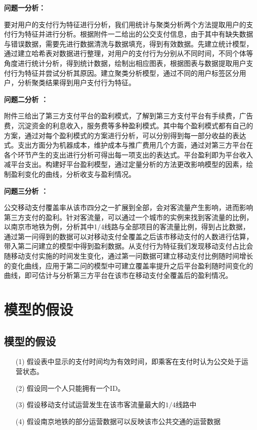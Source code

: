 \documentclass[withoutpreface,bwprint]{cumcmthesis} %
\begin{document}
\textbf{问题一分析：}

要对用户的支付行为特征进行分析，我们用统计与聚类分析两个方法提取用户的支付行为特征并进行分析。根据附件一二给出的公交支付信息，由于其中有缺失数据与错误数据，需要先进行数据清洗与数据填充，得到有效数据。先建立统计模型，通过建立哈希表对数据进行整理，对用户的支付行为分别从不同时间，不同个体等角度进行统计分析，得到统计数据，绘制出相应图表，根据图表与数据提取用户支付行为特征并尝试分析其原因。建立聚类分析模型，通过不同的用户标签区分用户，分析聚类结果得到用户支付行为特征。

\textbf{问题二分析 ：}

附件三给出了第三方支付平台的盈利模式，了解到第三方支付平台有手续费，广告费，沉淀资金的利息收入，服务费等多种盈利模式。其中每个盈利模式都有自己的方案，通过对每个盈利模式的方案进行分析，可以分别得到每一部分收益的表达式。支出方面分为机器成本，维护成本与推广费用几个方面，通过对第三方平台在各个环节产生的支出进行分析可得出每一项支出的表达式。平台盈利即为平台收入减平台支出。构建好平台盈利模型，通过定量分析的方法更改影响模型的因素，绘制盈利变化的曲线，分析收支与盈利情况。

\textbf{问题三分析 ：}

公交移动支付覆盖率从该市四分之一扩展到全部，会对客流量产生影响，进而影响第三方支付的盈利。针对客流量，可以通过一个城市的实例来找到客流量的比例，以南京市地铁为例，分析其中1/4线路与全部项目的客流量比例，得到占比数据，通过第一问得到的数据可以对移动支付全覆盖之后该市移动支付的人数进行估算，带入第二问建立的模型中得到盈利数据。从支付行为特征我们发现移动支付占比会随移动支付实施的时间发生变化，通过第一问数据可建立移动支付比例随时间增长的变化曲线，应用于第二问的模型中可建立覆盖率提升之后平台盈利随时间变化的曲线，即可估计与分析第三方平台在该市在移动支付全覆盖后的盈利情况。

\section{模型的假设}


\subsection{模型的假设}

\begin{itemize}
\item[(1)] 假设表中显示的支付时间均为有效时间，即乘客在支付时认为公交处于运营状态。
\item[(2)] 假设同一个人只能拥有一个ID。
\item[(3)] 假设移动支付试运营发生在该市客流量最大的$1/4$线路中
\item[(4)] 假设南京地铁的部分运营数据可以反映该市公共交通的运营数据 
\end{itemize}
\end{document}
